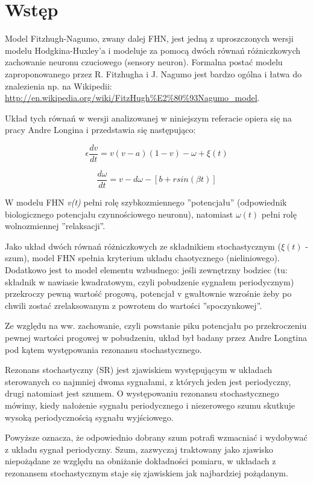 \documentclass[12pt]{article}
\begin{document}
  \section{Wstęp}
  Model Fitzhugh-Nagumo, zwany dalej FHN, jest jedną z uproszczonych wersji modelu Hodgkina-Huxley'a i modeluje za pomocą dwóch równań różniczkowych zachowanie neuronu czuciowego (sensory neuron). Formalna postać modelu zaproponowanego przez R. Fitzhugha i J. Nagumo jest bardzo ogólna i łatwa do znalezienia np. na Wikipedii: \url{http://en.wikipedia.org/wiki/FitzHugh%E2%80%93Nagumo_model}.
  
  Układ tych równań w wersji analizowanej w niniejszym referacie opiera się na pracy Andre Longina i przedstawia się następująco: 

  \begin{equation} \label{eq:v}
    \epsilon \frac{dv}{dt} = v(v-a)(1-v)- \omega + \xi(t)
  \end{equation}

  \begin{equation} \label{eq:w}
    \frac{d \omega}{dt} = v - d \omega - [b + r sin(\beta t)]
  \end{equation}

  W modelu FHN \emph{v(t)} pełni rolę szybkozmiennego ''potencjału'' (odpowiednik biologicznego potencjału czynnościowego neuronu), natomiast $\omega (t)$ pełni rolę wolnozmiennej ''relaksacji''.

  Jako układ dwóch równań różniczkowych ze składnikiem stochastycznym ($\xi(t)$ - szum), model FHN spełnia kryterium układu chaotycznego (nieliniowego). Dodatkowo jest to model elementu wzbudnego: jeśli zewnętrzny bodziec (tu: składnik w nawiasie kwadratowym, czyli pobudzenie sygnałem periodycznym) przekroczy pewną wartość progową, potencjał v gwałtownie wzrośnie żeby po chwili zostać zrelaksowanym z powrotem do wartości ''spoczynkowej''.

  Ze względu na ww. zachowanie, czyli powstanie piku potencjału po przekroczeniu pewnej wartości progowej w pobudzeniu, układ był badany przez Andre Longtina pod kątem występowania rezonansu stochastycznego.

  Rezonans stochastyczny (SR) jest zjawiskiem występującym w układach sterowanych co najmniej dwoma sygnałami, z których jeden jest periodyczny, drugi natomiast jest szumem. O występowaniu rezonansu stochastycznego mówimy, kiedy nałożenie sygnału periodycznego i niezerowego szumu skutkuje wysoką periodycznością sygnału wyjściowego.
  
  Powyższe oznacza, że odpowiednio dobrany szum potrafi wzmacniać i wydobywać z układu sygnał periodyczny. Szum, zazwyczaj traktowany jako zjawisko niepożądane ze względu na obniżanie dokładności pomiaru, w układach z rezonansem stochastycznym staje się zjawiskiem jak najbardziej pożądanym.
\end{document}
